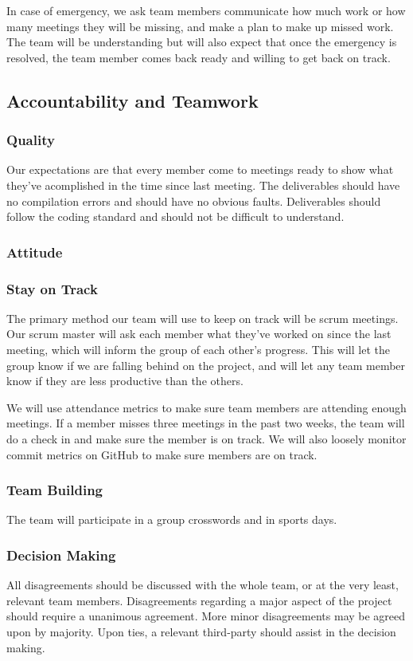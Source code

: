 \documentclass{article}
\begin{document}
In case of emergency, we ask team members communicate how much work or how many meetings they will be missing, and
make a plan to make up missed work. The team will be understanding but will also expect that once the
emergency is resolved, the team member comes back ready and willing to get back on track.

\subsection*{Accountability and Teamwork}

\subsubsection*{Quality} 

Our expectations are that every member come to meetings ready to show what they've acomplished
in the time since last meeting. The deliverables should have no compilation errors and should
have no obvious faults. Deliverables should follow the coding standard and should not be
difficult to understand.

\subsubsection*{Attitude}

\subsubsection*{Stay on Track}

The primary method our team will use to keep on track will be scrum meetings.
Our scrum master will ask each member what they've worked on since the last
meeting, which will inform the group of each other's progress. This will let
the group know if we are falling behind on the project, and will let any team
member know if they are less productive than the others.\newline

We will use attendance metrics to make sure team members are attending enough
meetings. If a member misses three meetings in the past two weeks, the team will do a
check in and make sure the member is on track. We will also loosely monitor
commit metrics on GitHub to make sure members are on track. 

\subsubsection*{Team Building}
The team will participate in a group crosswords and in sports days.

\subsubsection*{Decision Making} 

All disagreements should be discussed with the whole team, or at the very least, relevant team members.
Disagreements regarding a major aspect of the project should require a unanimous agreement.
More minor disagreements may be agreed upon by majority.
Upon ties, a relevant third-party should assist in the decision making.
\end{document}
